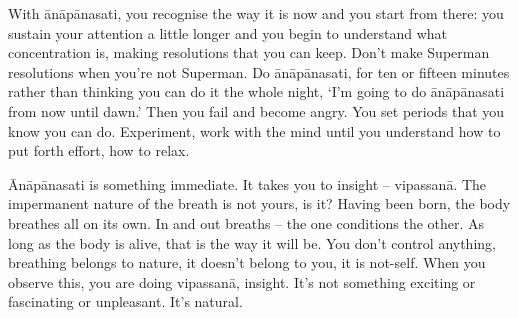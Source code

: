 With ānāpānasati, you recognise the way it is now and you start from there: you sustain your attention a little longer and you begin to understand what concentration is, making resolutions that you can keep. Don't make Superman resolutions when you're not Superman. Do ānāpānasati, for ten or fifteen minutes rather than thinking you can do it the whole night, `I'm going to do ānāpānasati from now until dawn.' Then you fail and become angry. You set periods that you know you can do. Experiment, work with the mind until you understand how to put forth effort, how to relax.

Ānāpānasati is something immediate. It takes you to insight -- vipassanā. The impermanent nature of the breath is not yours, is it? Having been born, the body breathes all on its own. In and out breaths -- the one conditions the other. As long as the body is alive, that is the way it will be. You don't control anything, breathing belongs to nature, it doesn't belong to you, it is not-self. When you observe this, you are doing vipassanā, insight. It's not something exciting or fascinating or unpleasant. It's natural.

